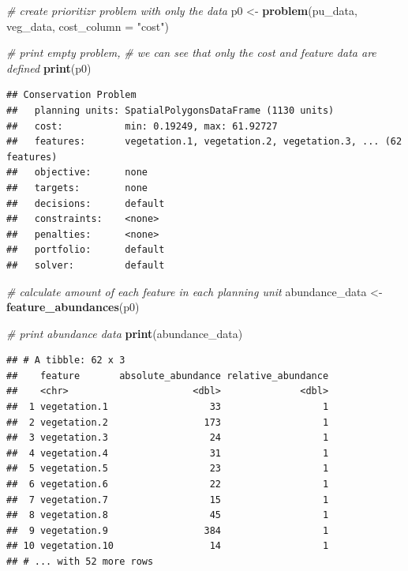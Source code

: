 \documentclass[12pt,]{book}
\newenvironment{Shaded}{\begin{snugshade}}{\end{snugshade}}
\newcommand{\KeywordTok}[1]{\textcolor[rgb]{0.13,0.29,0.53}{\textbf{#1}}}
\newcommand{\DataTypeTok}[1]{\textcolor[rgb]{0.13,0.29,0.53}{#1}}
\newcommand{\StringTok}[1]{\textcolor[rgb]{0.31,0.60,0.02}{#1}}
\newcommand{\CommentTok}[1]{\textcolor[rgb]{0.56,0.35,0.01}{\textit{#1}}}
\newcommand{\NormalTok}[1]{#1}
\begin{document}
\begin{Shaded}
\begin{Highlighting}[]
\CommentTok{# create prioritizr problem with only the data}
\NormalTok{p0 <-}\StringTok{ }\KeywordTok{problem}\NormalTok{(pu_data, veg_data, }\DataTypeTok{cost_column =} \StringTok{"cost"}\NormalTok{)}

\CommentTok{# print empty problem,}
\CommentTok{# we can see that only the cost and feature data are defined}
\KeywordTok{print}\NormalTok{(p0)}
\end{Highlighting}
\end{Shaded}

\begin{verbatim}
## Conservation Problem
##   planning units: SpatialPolygonsDataFrame (1130 units)
##   cost:           min: 0.19249, max: 61.92727
##   features:       vegetation.1, vegetation.2, vegetation.3, ... (62 features)
##   objective:      none
##   targets:        none
##   decisions:      default
##   constraints:    <none>
##   penalties:      <none>
##   portfolio:      default
##   solver:         default
\end{verbatim}

\begin{Shaded}
\begin{Highlighting}[]
\CommentTok{# calculate amount of each feature in each planning unit}
\NormalTok{abundance_data <-}\StringTok{ }\KeywordTok{feature_abundances}\NormalTok{(p0)}

\CommentTok{# print abundance data}
\KeywordTok{print}\NormalTok{(abundance_data)}
\end{Highlighting}
\end{Shaded}

\begin{verbatim}
## # A tibble: 62 x 3
##    feature       absolute_abundance relative_abundance
##    <chr>                      <dbl>              <dbl>
##  1 vegetation.1                  33                  1
##  2 vegetation.2                 173                  1
##  3 vegetation.3                  24                  1
##  4 vegetation.4                  31                  1
##  5 vegetation.5                  23                  1
##  6 vegetation.6                  22                  1
##  7 vegetation.7                  15                  1
##  8 vegetation.8                  45                  1
##  9 vegetation.9                 384                  1
## 10 vegetation.10                 14                  1
## # ... with 52 more rows
\end{verbatim}
\end{document}
